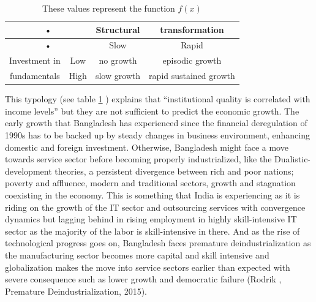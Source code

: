 \documentclass[11pt,a4paper]{article}
\begin{document}
\begin{table}[H]
\def\arraystretch {1.5}
\centering


\begin{tabular}{|c|c|c|c|}
\hline 
\multicolumn{2}{|c|}{•} & Structural & transformation \\ 
\hline 
\multicolumn{2}{|c|}{•} & Slow  & Rapid  \\ 
\hline 
Investment in & Low  & no growth & episodic growth \\ 
\hline 
fundamentals  & High  & slow growth & rapid sustained growth \\ 
\hline 
\end{tabular} 

\caption{These values represent the function $f(x)$}
\label{tab: data 1}
\end{table}



This typology (see table \ref{tab: data 1} ) explains that “institutional quality is correlated with income levels” but they are not sufficient to predict the economic growth. The early growth that Bangladesh has experienced since the financial deregulation of 1990s has to be backed up by steady changes in business environment, enhancing domestic and foreign investment. Otherwise, Bangladesh might face a move towards service sector before becoming properly industrialized, like the Dualistic-development theories, a persistent divergence between rich and poor nations; poverty and affluence, modern and traditional sectors, growth and stagnation coexisting in the economy. This is something that India is experiencing as it is riding on the growth of the IT sector and outsourcing services with convergence dynamics but lagging behind in rising employment in highly skill-intensive IT sector as the majority of the labor is skill-intensive in there. And as the rise of technological progress goes on, Bangladesh faces premature deindustrialization as the manufacturing sector becomes more capital and skill intensive and globalization makes the move into service sectors earlier than expected with severe consequence such as lower growth and democratic failure (Rodrik , Premature Deindustrialization, 2015).
\end{document}
